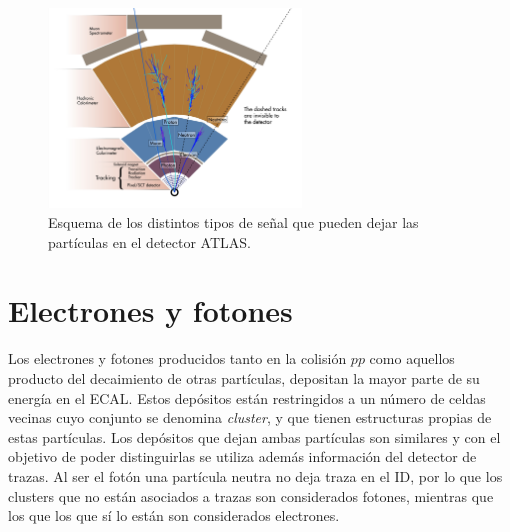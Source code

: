 \begin{figure}
\centering
  \includegraphics[width=0.6\textwidth]{images/cross_section_2-eps-converted-to.pdf}
\caption{Esquema de los distintos tipos de señal que pueden dejar las partículas en el detector ATLAS.  
}
\label{particulasATLAS}
\end{figure}

\section{Electrones y fotones}\label{sec:ph_el}


Los electrones y fotones producidos tanto en la colisión $pp$ como aquellos producto del decaimiento de otras partículas, depositan la mayor parte de su energía en el ECAL. Estos depósitos están restringidos a un número de celdas vecinas cuyo conjunto se denomina \textit{cluster}, y que tienen estructuras propias de estas partículas. Los depósitos que dejan ambas partículas son similares y con el objetivo de poder distinguirlas se utiliza además información del detector de trazas. Al ser el fotón una partícula neutra no deja traza en el ID, por lo que los clusters que no están asociados a trazas son considerados fotones, mientras que los que los que sí lo están son considerados electrones. 

